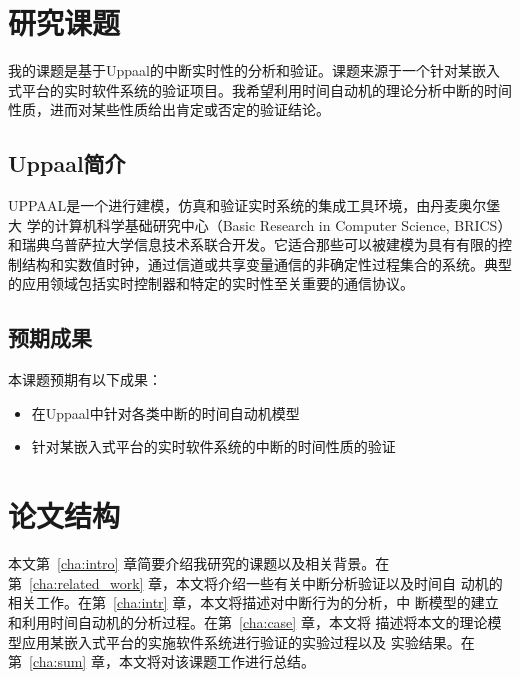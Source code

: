 \section{研究课题}
\label{sec:subject}
我的课题是基于Uppaal的中断实时性的分析和验证。课题来源于一个针对某嵌入
式平台的实时软件系统的验证项目。我希望利用时间自动机的理论分析中断的时间
性质，进而对某些性质给出肯定或否定的验证结论。

\subsection{Uppaal简介}
\label{subsec:Uppaal_intro}
UPPAAL是一个进行建模，仿真和验证实时系统的集成工具环境，由丹麦奥尔堡大
学的计算机科学基础研究中心（Basic Research in Computer Science, BRICS）
和瑞典乌普萨拉大学信息技术系联合开发。它适合那些可以被建模为具有有限的控
制结构和实数值时钟，通过信道或共享变量通信的非确定性过程集合的系统。典型
的应用领域包括实时控制器和特定的实时性至关重要的通信协议。

\subsection{预期成果}
\label{subsec:expectation}
本课题预期有以下成果：
\begin{itemize}
	\item 在Uppaal中针对各类中断的时间自动机模型
	\item 针对某嵌入式平台的实时软件系统的中断的时间性质的验证
\end{itemize}

\section{论文结构}
\label{sec:structure}
本文第~\ref{cha:intro} 章简要介绍我研究的课题以及相关背景。在
第~\ref{cha:related_work} 章，本文将介绍一些有关中断分析验证以及时间自
动机的相关工作。在第~\ref{cha:intr} 章，本文将描述对中断行为的分析，中
断模型的建立和利用时间自动机的分析过程。在第~\ref{cha:case} 章，本文将
描述将本文的理论模型应用某嵌入式平台的实施软件系统进行验证的实验过程以及
实验结果。在第~\ref{cha:sum} 章，本文将对该课题工作进行总结。


